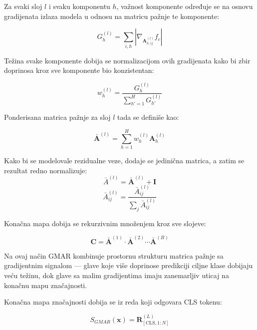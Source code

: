 Za svaki sloj $l$ i svaku komponentu $h$, važnost komponente određuje se na osnovu 
gradijenata izlaza modela u odnosu na matricu pažnje te komponente:

\begin{equation}
    G_h^{(l)} = \sum_{i,h} \left| \nabla_{\mathbf{A}_{h,ij}^{(l)}} f_c \right|
\end{equation}

Težina svake komponente dobija se normalizacijom ovih gradijenata kako bi zbir 
doprinosa kroz sve komponente bio konzistentan:

\begin{equation}
    w_h^{(l)} = \frac{G_h^{(l)}}{\sum_{h'=1}^{H} G_{h'}^{(l)}}
\end{equation}

Ponderisana matrica pažnje za sloj $l$ tada se definiše kao:

\begin{equation}
    \bar{\mathbf{A}}^{(l)} = \sum_{h=1}^{H} w_h^{(l)} \mathbf{A}_h^{(l)}
\end{equation}

Kako bi se modelovale rezidualne veze, dodaje se jedinična matrica, a zatim se rezultat redno normalizuje:
\begin{equation}
    \bar{A}^{(l)} = \bar{\mathbf{A}}^{(l)} + \mathbf{I}
\end{equation}
\begin{equation}
    \bar{A}^{(l)}_{ij} = \frac{\bar{A}^{(l)}_{ij}}{\sum_j\bar{A}^{(l)}_{ij}} 
\end{equation}

Konačna mapa dobija se rekurzivnim množenjem kroz sve slojeve:

\begin{equation}
    \mathbf{C} = \bar{\mathbf{A}}^{(1)} \cdot \bar{\mathbf{A}}^{(2)} 
    \cdots \bar{\mathbf{A}}^{(B)}
\end{equation}

Na ovaj način GMAR kombinuje prostornu strukturu matrica pažnje sa gradijentnim signalom — glave koje više doprinose 
predikciji ciljne klase dobijaju veću težinu, dok glave sa malim 
gradijentima imaju zanemarljiv uticaj na konačnu mapu značajnosti.

Konačna mapa značajnosti dobija se iz reda koji odgovara CLS tokenu:

\begin{equation}
    S_{GMAR}(\mathbf{x}) = \mathbf{R}^{(L)}_{[\text{CLS}, 1:N]}
\end{equation}

